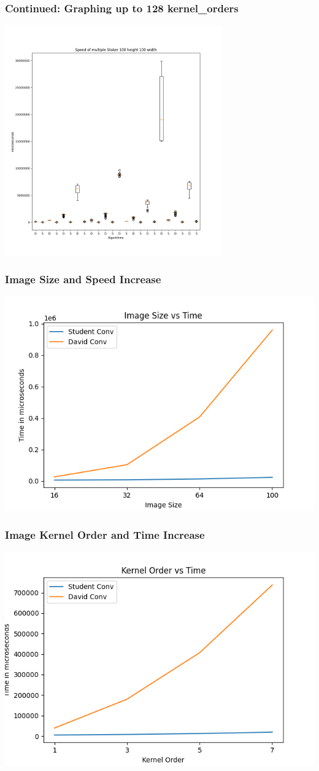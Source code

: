 \documentclass{beamer}
\begin{document}
\begin{frame}[fragile]
\frametitle{Continued: Graphing up to 128 kernel\_orders}
\includegraphics[width=0.7\textwidth]{images/Stoker-100-100}
\end{frame}

\begin{frame}[fragile]
\frametitle{Image Size and Speed Increase}
\includegraphics[width=1\textwidth]{images/Image_size_vs_time_X-X-5-32-32}
\end{frame}

\begin{frame}[fragile]
\frametitle{Image Kernel Order and Time Increase}
\includegraphics[width=1\textwidth]{images/kernel_vs_time_64-64-X-32-32}
\end{frame}
\end{document}
